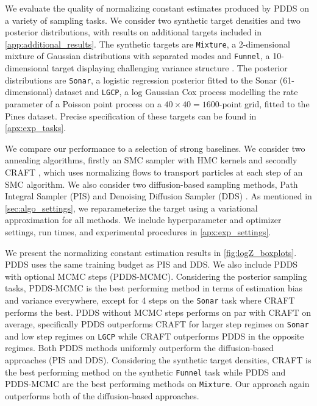 \documentclass{article}
\theoremstyle{plain}
\theoremstyle{definition}
\theoremstyle{remark}
\begin{document}
We evaluate the quality of normalizing constant estimates produced by PDDS on a variety of sampling tasks. We consider two synthetic target densities and two posterior distributions, with results on additional targets included in \cref{app:additional_results}. The synthetic targets are \verb|Mixture|, a 2-dimensional mixture of Gaussian distributions with separated modes \citep{arbel2021annealed} and \verb|Funnel|, a 10-dimensional target displaying challenging variance structure \citep{Neal:2003}. The posterior distributions are \verb|Sonar|, a logistic regression posterior fitted to the Sonar (61-dimensional) dataset and \verb|LGCP|, a log Gaussian Cox process \citep{Moller:1998} modelling the rate parameter of a Poisson point process on a $40\times40=1600$-point grid, fitted to the Pines dataset. Precise specification of these targets can be found in \cref{apx:exp_tasks}.

We compare our performance to a selection of strong baselines. We consider two annealing algorithms, firstly an SMC sampler \citep{del2006sequential} with HMC kernels and secondly CRAFT \citep{Matthews2022}, which uses normalizing flows to transport particles at each step of an SMC algorithm. We also consider two diffusion-based sampling methods, Path Integral Sampler (PIS) \citep{zhangyongxinchen2021path} and Denoising Diffusion Sampler (DDS) \citep{vargasDDSampler2023}. As mentioned in \cref{sec:algo_settings}, we reparameterize the target using a variational approximation for all methods. We include hyperparameter and optimizer settings, run times, and experimental procedures in \cref{apx:exp_settings}.

We present the normalizing constant estimation results in \cref{fig:logZ_boxplots}. PDDS uses the same training budget as PIS and DDS. We also include PDDS with optional MCMC steps (PDDS-MCMC). Considering the posterior sampling tasks, PDDS-MCMC is the best performing method in terms of estimation bias and variance everywhere, except for 4 steps on the \verb|Sonar| task where CRAFT performs the best. PDDS without MCMC steps performs on par with CRAFT on average, specifically PDDS outperforms CRAFT for larger step regimes on \verb|Sonar| and low step regimes on \verb|LGCP| while CRAFT outperforms PDDS in the opposite regimes. Both PDDS methods uniformly outperform the diffusion-based approaches (PIS and DDS). Considering the synthetic target densities, CRAFT is the best performing method on the synthetic \verb|Funnel| task while PDDS and PDDS-MCMC are the best performing methods on \verb|Mixture|. Our approach again outperforms both of the diffusion-based approaches.
\end{document}
